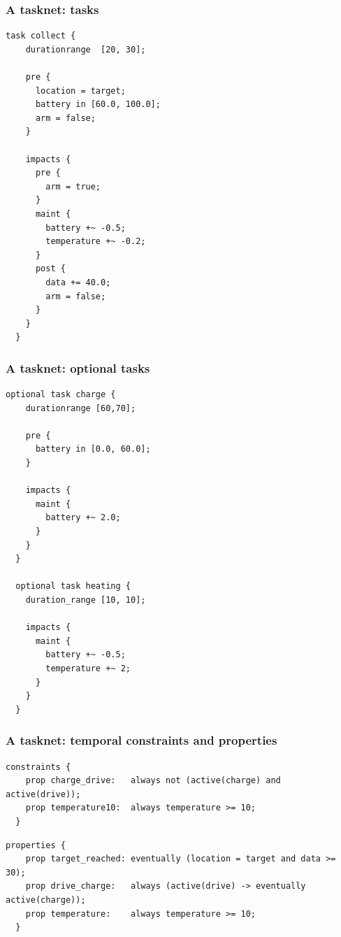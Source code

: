 \begin{frame}[fragile]
  \frametitle{A tasknet: tasks} \small

\begin{lstlisting}[language=tasknetdsl,frame=single]
  task collect {
    durationrange  [20, 30];

    pre {
      location = target;
      battery in [60.0, 100.0];
      arm = false;
    }

    impacts {
      pre {
        arm = true;
      }
      maint {
        battery +~ -0.5; 
        temperature +~ -0.2;
      }
      post {
        data += 40.0; 
        arm = false;
      }
    }
  }
\end{lstlisting}

\end{frame}

\begin{frame}[fragile]
  \frametitle{A tasknet: optional tasks} \small

\begin{lstlisting}[language=tasknetdsl,frame=single]
 optional task charge {
    durationrange [60,70];

    pre {
      battery in [0.0, 60.0];
    }

    impacts {
      maint {
        battery +~ 2.0; 
      }
    }
  }

  optional task heating {
    duration_range [10, 10];

    impacts {
      maint {
        battery +~ -0.5; 
        temperature +~ 2; 
      }
    }
  }  
\end{lstlisting}

\end{frame}

\begin{frame}[fragile]
  \frametitle{A tasknet: temporal constraints and properties} \small

\begin{lstlisting}[language=tasknetdsl,frame=single]
  constraints {
    prop charge_drive:   always not (active(charge) and active(drive));
    prop temperature10:  always temperature >= 10;
  }
\end{lstlisting}

\pause

\begin{lstlisting}[language=tasknetdsl,frame=single]
  properties {
    prop target_reached: eventually (location = target and data >= 30);
    prop drive_charge:   always (active(drive) -> eventually active(charge));
    prop temperature:    always temperature >= 10;
  }
\end{lstlisting}

\end{frame}

